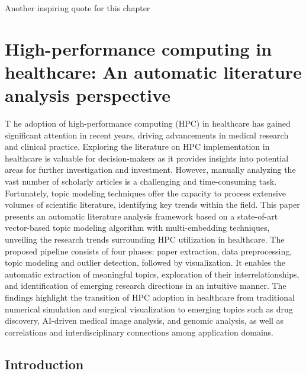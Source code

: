
\begin{savequote}[75mm]
Another inspiring quote for this chapter
\end{savequote}


\chapter[High-performance computing in healthcare: An automatic literature analysis perspective]{High-performance computing in healthcare: An automatic literature analysis perspective}

\lettrine[lines=3]{\textcolor{SchoolColor}{T}}{%
}
he adoption of high-performance computing (HPC) in healthcare has gained significant attention in recent years, driving advancements in medical research and clinical practice. Exploring the literature on HPC implementation in healthcare is valuable for decision-makers as it provides insights into potential areas for further investigation and investment. However, manually analyzing the vast number of scholarly articles is a challenging and time-consuming task. Fortunately, topic modeling techniques offer the capacity to process extensive volumes of scientific literature, identifying key trends within the field. This paper presents an automatic literature analysis framework based on a state-of-art vector-based topic modeling algorithm with multi-embedding techniques, unveiling the research trends surrounding HPC utilization in healthcare. The proposed pipeline consists of four phases: paper extraction, data preprocessing, topic modeling and outlier detection, followed by visualization. It enables the automatic extraction of meaningful topics, exploration of their interrelationships, and identification of emerging research directions in an intuitive manner. The findings highlight the transition of HPC adoption in healthcare from traditional numerical simulation and surgical visualization to emerging topics such as drug discovery, AI-driven medical image analysis, and genomic analysis, as well as correlations and interdisciplinary connections among application domains.

\section{Introduction}\label{se:2-1}

